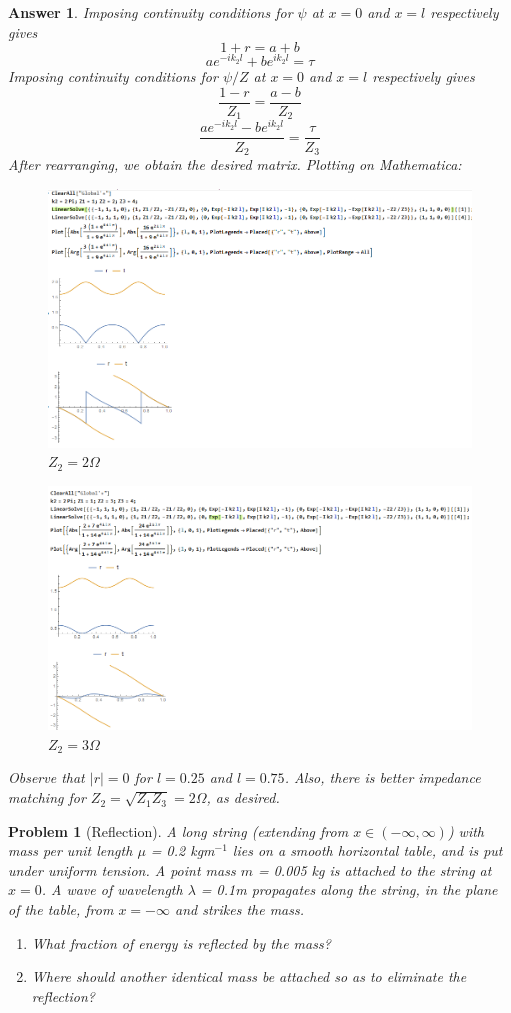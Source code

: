 \documentclass[a4paper]{article}
\newtheorem{ans}{Answer}[section]
\theoremstyle{new}
\newtheorem{qns}{Problem}[section]
\begin{document}
\begin{ans}
Imposing continuity conditions for $\psi$ at $x=0$ and $x=l$ respectively gives
$$1+r=a+b$$
$$ae^{-ik_2l}+be^{ik_2l}=\tau$$
Imposing continuity conditions for $\psi/Z$ at $x=0$ and $x=l$ respectively gives
$$\frac{1-r}{Z_1}=\frac{a-b}{Z_2}$$
$$\frac{ae^{-ik_2l}-be^{ik_2l}}{Z_2}=\frac{\tau}{Z_3}$$
After rearranging, we obtain the desired matrix. Plotting on Mathematica:
\begin{figure}[H]
    \centering
    \includegraphics[width=\linewidth]{2_15a.PNG}
    \caption{$Z_2=2\Omega$}
\end{figure}
\begin{figure}[H]
    \centering
    \includegraphics[width=\linewidth]{2_15b.PNG}
    \caption{$Z_2=3\Omega$}
\end{figure}
Observe that $|r|=0$ for $l=0.25$ and $l=0.75$. Also, there is better impedance matching for $Z_2=\sqrt{Z_1Z_3}=2\Omega$, as desired.
\end{ans}
\newpage
\begin{qns}[Reflection]
A long string (extending from $x\in(-\infty,\infty)$) with mass per unit length $\mu$ = 0.2 kgm$^{-1}$ lies on a smooth horizontal table, and is put under uniform tension. A point mass $m$ = 0.005 kg is attached to the string at $x = 0$. A wave of wavelength $\lambda$ = 0.1m propagates along the string, in the plane of the table, from $x=-\infty$ and strikes the mass.
\begin{enumerate}[label=(\alph*)]
    \item What fraction of energy is reflected by the mass?
    \item Where should another identical mass be attached so as to eliminate the reflection?
\end{enumerate}
\end{qns}
\end{document}
